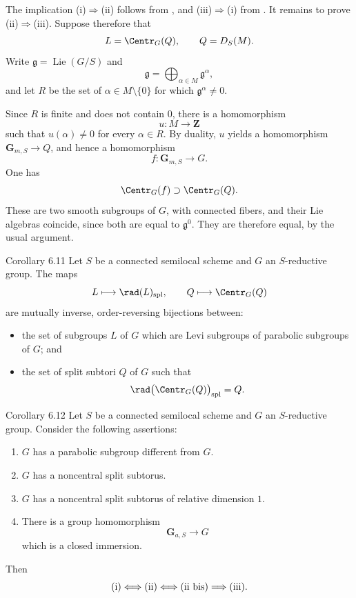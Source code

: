 The implication \textup{(i)}\(\Rightarrow\)\textup{(ii)} follows
from , and \textup{(iii)}\(\Rightarrow\)\textup{(i)} from .
It remains to prove
\textup{(ii)}\(\Rightarrow\)\textup{(iii)}.  Suppose therefore that
\[
 L=\Centr_G(Q),\qquad Q=D_S(M).
\]
Write \(\mathfrak g=\operatorname{Lie}(G/S)\) and
\[
 \mathfrak g=\bigoplus_{\alpha\in M}\mathfrak g^\alpha,
\]
and let \(R\) be the set of
\(\alpha\in M\setminus\{0\}\) for which
\(\mathfrak g^\alpha\ne0\).

Since \(R\) is finite and does not contain \(0\), there is a
homomorphism
\[
 u:M\longrightarrow\mathbf Z
\]
such that \(u(\alpha)\ne0\) for every \(\alpha\in R\).  By duality,
\(u\) yields a homomorphism \(\mathbf G_{m,S}\to Q\), and hence a
homomorphism
\[
 f:\mathbf G_{m,S}\longrightarrow G.
\]
One has
\[
 \Centr_G(f)\supset\Centr_G(Q).
\]
These are two smooth subgroups of \(G\), with connected fibers, and
their Lie algebras coincide, since both are equal to
\(\mathfrak g^0\).  They are therefore equal, by the usual
argument.

\begin{sgastatement}{Corollary 6.11}
Let \(S\) be a connected semilocal scheme and \(G\) an
\(S\)-reductive group.  The maps
\[
 L\longmapsto\rad(L)_{\mathrm{spl}},
 \qquad
 Q\longmapsto\Centr_G(Q)
\]
are mutually inverse, order-reversing bijections between:
\begin{itemize}
\item the set of subgroups \(L\) of \(G\) which are Levi subgroups
of parabolic subgroups of \(G\); and
\item the set of split subtori \(Q\) of \(G\) such that
\[
 \rad\bigl(\Centr_G(Q)\bigr)_{\mathrm{spl}}=Q.
\]
\end{itemize}
\end{sgastatement}

\begin{sgastatement}{Corollary 6.12}
Let \(S\) be a connected semilocal scheme and \(G\) an
\(S\)-reductive group.  Consider the following assertions:
\begin{enumerate}[label=\textup{(\roman*)}]
\item \(G\) has a parabolic subgroup different from \(G\).
\item \(G\) has a noncentral split subtorus.
\item[\textup{(ii bis)}] \(G\) has a noncentral split subtorus of
relative dimension \(1\).
\item There is a group homomorphism
\[
 \mathbf G_{a,S}\longrightarrow G
\]
which is a closed immersion.
\end{enumerate}
Then
\[
 \textup{(i)}
 \Longleftrightarrow\textup{(ii)}
 \Longleftrightarrow\textup{(ii bis)}
 \Longrightarrow\textup{(iii)}.
\]
\end{sgastatement}

